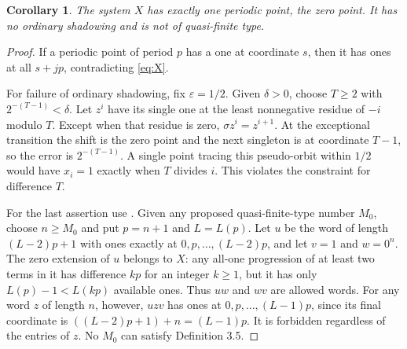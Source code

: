 \documentclass[11pt]{article}
\newtheorem{corollary}[theorem]{Corollary}
\begin{document}
\begin{corollary}\label{cor:companions}
The system $X$ has exactly one periodic point, the zero point.
It has no ordinary shadowing and is not of quasi-finite type.
\end{corollary}
\begin{proof}
If a periodic point of period $p$ has a one at coordinate $s$,
then it has ones at all $s+jp$, contradicting \eqref{eq:X}.

For failure of ordinary shadowing, fix $\varepsilon=1/2$.
Given $\delta>0$, choose $T\geq2$ with $2^{-(T-1)}<\delta$.
Let $z^i$ have its single one at the least nonnegative residue
of $-i$ modulo $T$. Except when that residue is zero,
$\sigma z^i=z^{i+1}$. At the exceptional transition the shift
is the zero point and the next singleton is at coordinate $T-1$,
so the error is $2^{-(T-1)}$. A single point tracing this pseudo-orbit
within $1/2$ would have $x_i=1$ exactly when $T$ divides $i$.
This violates the constraint for difference $T$.

For the last assertion use \cite[Definition 3.5]{MS}.
Given any proposed quasi-finite-type number $M_0$, choose
$n\geq M_0$ and put $p=n+1$ and $L=L(p)$.
Let $u$ be the word of length $(L-2)p+1$ with ones exactly at
$0,p,\ldots,(L-2)p$, and let $v=1$ and $w=0^n$.
The zero extension of $u$ belongs to $X$: any all-one progression
of at least two terms in it has difference $kp$ for an integer
$k\geq1$, but it has only $L(p)-1<L(kp)$ available ones.
Thus $uw$ and $wv$ are allowed words. For any word $z$ of length
$n$, however, $uzv$ has ones at
$0,p,\ldots,(L-1)p$, since its final coordinate is
$((L-2)p+1)+n=(L-1)p$.
It is forbidden regardless of the entries of $z$.
No $M_0$ can satisfy Definition 3.5.
\end{proof}
\end{document}
